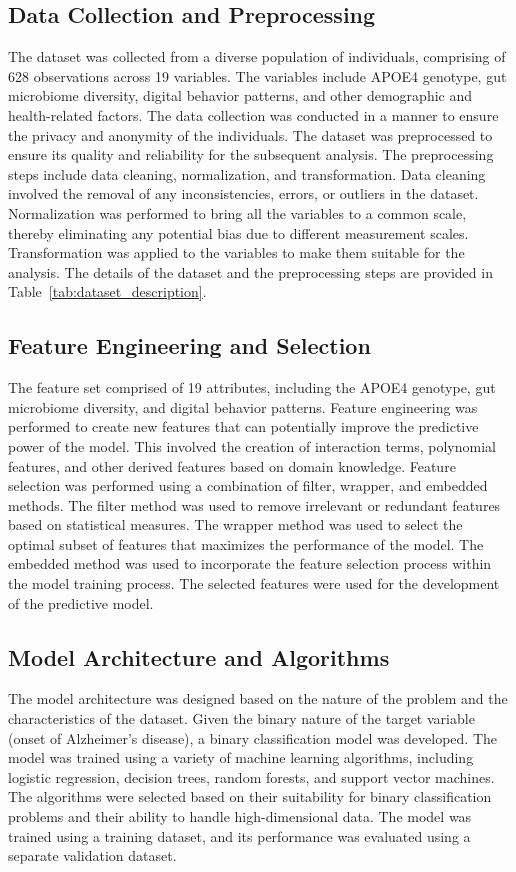 \documentclass[conference]{IEEEtran}
\begin{document}
\subsection{Data Collection and Preprocessing}
The dataset was collected from a diverse population of individuals, comprising of 628 observations across 19 variables. The variables include APOE4 genotype, gut microbiome diversity, digital behavior patterns, and other demographic and health-related factors. The data collection was conducted in a manner to ensure the privacy and anonymity of the individuals. The dataset was preprocessed to ensure its quality and reliability for the subsequent analysis. The preprocessing steps include data cleaning, normalization, and transformation. Data cleaning involved the removal of any inconsistencies, errors, or outliers in the dataset. Normalization was performed to bring all the variables to a common scale, thereby eliminating any potential bias due to different measurement scales. Transformation was applied to the variables to make them suitable for the analysis. The details of the dataset and the preprocessing steps are provided in Table~\ref{tab:dataset_description}.

\subsection{Feature Engineering and Selection}
The feature set comprised of 19 attributes, including the APOE4 genotype, gut microbiome diversity, and digital behavior patterns. Feature engineering was performed to create new features that can potentially improve the predictive power of the model. This involved the creation of interaction terms, polynomial features, and other derived features based on domain knowledge. Feature selection was performed using a combination of filter, wrapper, and embedded methods. The filter method was used to remove irrelevant or redundant features based on statistical measures. The wrapper method was used to select the optimal subset of features that maximizes the performance of the model. The embedded method was used to incorporate the feature selection process within the model training process. The selected features were used for the development of the predictive model.

\subsection{Model Architecture and Algorithms}
The model architecture was designed based on the nature of the problem and the characteristics of the dataset. Given the binary nature of the target variable (onset of Alzheimer's disease), a binary classification model was developed. The model was trained using a variety of machine learning algorithms, including logistic regression, decision trees, random forests, and support vector machines. The algorithms were selected based on their suitability for binary classification problems and their ability to handle high-dimensional data. The model was trained using a training dataset, and its performance was evaluated using a separate validation dataset.
\end{document}
